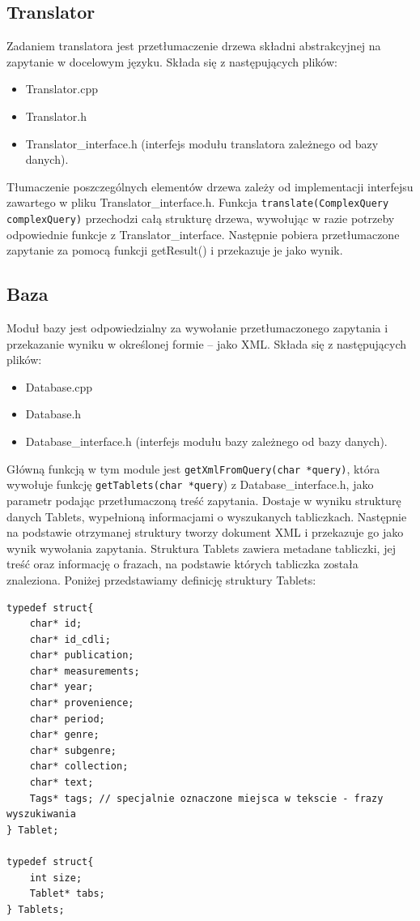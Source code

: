 \subsection{Translator}
Zadaniem translatora jest przetłumaczenie drzewa składni abstrakcyjnej na zapytanie w docelowym języku.
Składa się z następujących plików:
\begin {itemize}
 \item Translator.cpp
 \item Translator.h
 \item Translator\_interface.h (interfejs modułu translatora zależnego od bazy danych).
\end {itemize}

Tłumaczenie poszczególnych elementów drzewa zależy od implementacji interfejsu zawartego w pliku Translator\_interface.h. 
Funkcja \verb|translate(ComplexQuery complexQuery)| przechodzi całą strukturę drzewa, wywołując w razie 
potrzeby odpowiednie funkcje z Translator\_interface.
Następnie pobiera przetłumaczone zapytanie za pomocą funkcji getResult() i przekazuje je jako wynik.

\subsection{Baza}
Moduł bazy jest odpowiedzialny za wywołanie przetłumaczonego zapytania i przekazanie wyniku w określonej formie -- jako XML.
Składa się z następujących plików:
\begin {itemize}
 \item Database.cpp
 \item Database.h
 \item Database\_interface.h (interfejs modułu bazy zależnego od bazy danych).
\end {itemize}

Główną funkcją w tym module jest \verb|getXmlFromQuery(char *query)|, która
wywołuje funkcję \verb|getTablets(char *query|) z Database\_interface.h, jako parametr podając przetłumaczoną treść zapytania. 
Dostaje w wyniku strukturę danych Tablets, wypełnioną informacjami o wyszukanych tabliczkach.
Następnie na podstawie otrzymanej struktury tworzy dokument XML i przekazuje go jako wynik wywołania zapytania.
\newline
Struktura Tablets zawiera metadane tabliczki, jej treść oraz informację o frazach, na podstawie których tabliczka została znaleziona. 
Poniżej przedstawiamy definicję struktury Tablets:
\begin{verbatim}
typedef struct{    
    char* id;
    char* id_cdli;
    char* publication;
    char* measurements;
    char* year;
    char* provenience;
    char* period;
    char* genre;
    char* subgenre;
    char* collection;
    char* text;
    Tags* tags; // specjalnie oznaczone miejsca w tekscie - frazy wyszukiwania
} Tablet;

typedef struct{
    int size;
    Tablet* tabs;
} Tablets;
\end{verbatim}

